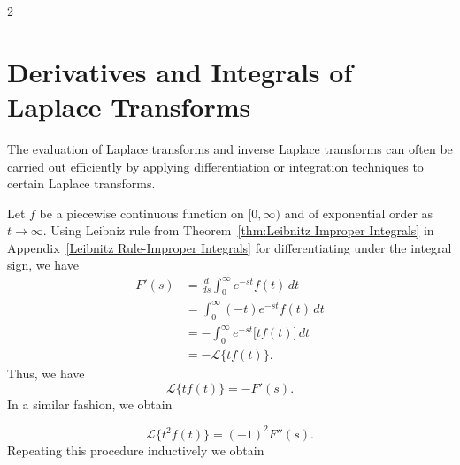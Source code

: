 \begin{multicols}{2}
\begin{Answer}[ref={EX72}]
\begin{tasks}[resume=false]
		\end{tasks} 
		
	\end{Answer}
\end{multicols}


\section{Derivatives and Integrals of Laplace Transforms}

The evaluation of Laplace transforms and inverse Laplace transforms can often be carried out efficiently by applying differentiation or integration techniques to certain Laplace transforms.


Let $f$ be a piecewise continuous function on $[0, \infty)$ and of exponential order as $t\to\infty$.
Using  Leibniz rule from Theorem~\ref{thm:Leibnitz Improper Integrals} in  Appendix~\ref{Leibnitz Rule-Improper Integrals} for differentiating under the integral sign, we have
\[
\begin{split}
	F'(s) &= \frac{d}{ds}\int_0^\infty e^{-st} f(t)\, dt\\
	&= \int_0^\infty (-t) e^{-st} f(t)\, dt\\
		&= -\int_0^\infty  e^{-st} \big[tf(t)\big]\, dt\\
		&=-\mathscr{L}\{tf(t)\}.
\end{split}
\]
Thus, we have
\[\mathscr{L}\{tf(t)\} =- F'(s).\]
In a similar fashion, we obtain

\[
\mathscr{L}\{t^2f(t)\}=	(-1)^2F''(s).
\]
Repeating this procedure inductively we obtain

